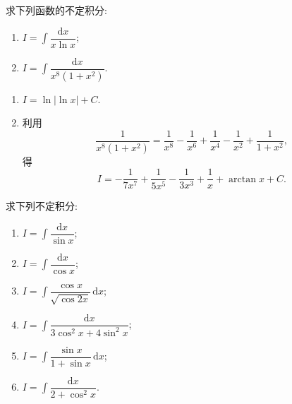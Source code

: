 \begin{example}
    求下列函数的不定积分:
    \begin{enumerate}
        \item $\displaystyle I=\int\dfrac{\mathrm{d}x}{x\ln x}$;
        \item $\displaystyle I=\int\dfrac{\mathrm{d}x}{x^8(1+x^2)}$.
    \end{enumerate}
\end{example}
\exampleblank

\begin{solution}
    \begin{enumerate}
        \item $\displaystyle I=\ln|\ln x|+C$.
        \item 利用
              \[
                  \dfrac{1}{x^8(1+x^2)}
                  =\dfrac{1}{x^8}-\dfrac{1}{x^6}+\dfrac{1}{x^4}-\dfrac{1}{x^2}+\dfrac{1}{1+x^2},
              \]
              得
              \[
                  I=-\dfrac{1}{7x^7}+\dfrac{1}{5x^5}-\dfrac{1}{3x^3}
                  +\dfrac{1}{x}+\arctan x+C.
              \]
    \end{enumerate}
\end{solution}

\begin{example}
    求下列不定积分:
    \begin{enumerate}
        \item $\displaystyle I=\int\dfrac{\mathrm{d}x}{\sin x}$;
        \item $\displaystyle I=\int\dfrac{\mathrm{d}x}{\cos x}$;
        \item $\displaystyle I=\int\dfrac{\cos x}{\sqrt{\cos2x}}\,\mathrm{d}x$;
        \item $\displaystyle I=\int\dfrac{\mathrm{d}x}{3\cos^2x+4\sin^2x}$;
        \item $\displaystyle I=\int\dfrac{\sin x}{1+\sin x}\,\mathrm{d}x$;
        \item $\displaystyle I=\int\dfrac{\mathrm{d}x}{2+\cos^2x}$.
    \end{enumerate}
\end{example}
\exampleblank

